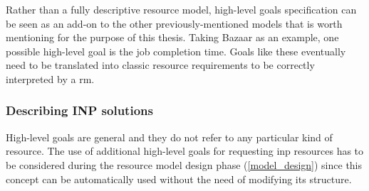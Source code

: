 Rather than a fully descriptive resource model, high-level goals specification can be seen as an add-on to the other previously-mentioned models that is worth mentioning for the purpose of this thesis.
Taking Bazaar \cite{bazaar} as an example, one possible high-level goal is the job completion time.
Goals like these eventually need to be translated into classic resource requirements to be correctly interpreted by a \gls{rm}.

\subsubsection{Describing INP solutions}
High-level goals are general and they do not refer to any particular kind of resource.
The use of additional high-level goals for requesting \gls{inp} resources has to be considered during the resource model design phase (\autoref{model_design}) since this concept can be automatically used without the need of modifying its structure.
